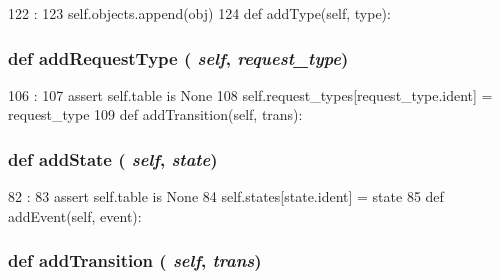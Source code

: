 \begin{DoxyCode}
122                             :
123         self.objects.append(obj)
124 
    def addType(self, type):
\end{DoxyCode}
\hypertarget{classslicc_1_1symbols_1_1StateMachine_1_1StateMachine_a2d53f96afcd199deeb93e18c887fc92d}{
\subsubsection[{addRequestType}]{\setlength{\rightskip}{0pt plus 5cm}def addRequestType ( {\em self}, \/   {\em request\_\-type})}}
\label{classslicc_1_1symbols_1_1StateMachine_1_1StateMachine_a2d53f96afcd199deeb93e18c887fc92d}



\begin{DoxyCode}
106                                           :
107         assert self.table is None
108         self.request_types[request_type.ident] = request_type
109 
    def addTransition(self, trans):
\end{DoxyCode}
\hypertarget{classslicc_1_1symbols_1_1StateMachine_1_1StateMachine_a6569c9bd5b0babd85dc5d9b39e07bafa}{
\subsubsection[{addState}]{\setlength{\rightskip}{0pt plus 5cm}def addState ( {\em self}, \/   {\em state})}}
\label{classslicc_1_1symbols_1_1StateMachine_1_1StateMachine_a6569c9bd5b0babd85dc5d9b39e07bafa}



\begin{DoxyCode}
82                              :
83         assert self.table is None
84         self.states[state.ident] = state
85 
    def addEvent(self, event):
\end{DoxyCode}
\hypertarget{classslicc_1_1symbols_1_1StateMachine_1_1StateMachine_a6e104d0b882481fa086a4a71f63e127f}{
\subsubsection[{addTransition}]{\setlength{\rightskip}{0pt plus 5cm}def addTransition ( {\em self}, \/   {\em trans})}}
\label{classslicc_1_1symbols_1_1StateMachine_1_1StateMachine_a6e104d0b882481fa086a4a71f63e127f}



